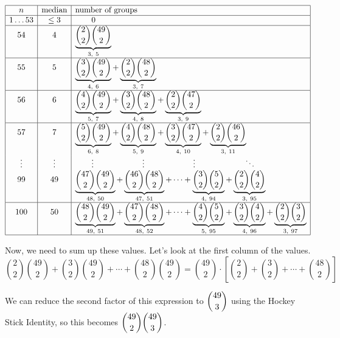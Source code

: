 \documentclass[12pt]{article}
\begin{document}
\begin{solution}{4}
    \[\begin{array}{|c|c|l|}
        \hline 
        \text{$n$} & \text{median} & \text{number of groups}
        \\\hline 
        1\dots53 & \le3 & \qquad 0
        \\\hline
        54 & 4 & \underbrace{\binom22\binom{49}2}_{3,\ 5}
        \\\hline
        55 & 5 & \underbrace{\binom32\binom{49}2}_{4,\ 6} +
                 \underbrace{\binom22\binom{48}2}_{3,\ 7}
        \\\hline
        56 & 6 & \underbrace{\binom{4}2\binom{49}2}_{5,\ 7} +
                 \underbrace{\binom32\binom{48}2}_{4,\ 8} +
                 \underbrace{\binom22\binom{47}2}_{3,\ 9}
        \\\hline
        57 & 7 & \underbrace{\binom{5}2\binom{49}2}_{6,\ 8} +
                 \underbrace{\binom42\binom{48}2}_{5,\ 9} +
                 \underbrace{\binom32\binom{47}2}_{4,\ 10} +
                 \underbrace{\binom22\binom{46}2}_{3,\ 11}
        \\
        \vdots & \vdots &\qquad\vdots\qquad\qquad\qquad\vdots\qquad\qquad\qquad\vdots\qquad\qquad\qquad\ddots
        \\
        99 & 49 & \underbrace{\binom{47}2\binom{49}2}_{48,\ 50} +
                  \underbrace{\binom{46}2\binom{48}2}_{47,\ 51} + \cdots +
                  \underbrace{\binom32 \binom52}_{4,\ 94} +
                  \underbrace{\binom22 \binom42}_{3,\ 95}
        \\\hline
        100 & 50 & \underbrace{\binom{48}2\binom{49}2}_{49,\ 51} +
                   \underbrace{\binom{47}2\binom{48}2}_{48,\ 52} + \cdots +
                   \underbrace{\binom42 \binom52}_{5,\ 95} + 
                   \underbrace{\binom32 \binom42}_{4,\ 96} + 
                   \underbrace{\binom22 \binom32}_{3,\ 97}
        \\\hline
    \end{array}\]

    Now, we need to sum up these values. Let's look at the first column of the values.
    \begin{equation*}
        \binom22\binom{49}2 + \binom32\binom{49}2 + \cdots + \binom{48}2\binom{49}2
         = \binom{49}2\cdot\left[\binom22+\binom32+\cdots+\binom{48}2\right]
    \end{equation*}
    
    We can reduce the second factor of this expression to $\dbinom{49}3$ using the Hockey Stick Identity,
    so this becomes $\dbinom{49}2\dbinom{49}3$.
    

\end{solution}
\end{document}
